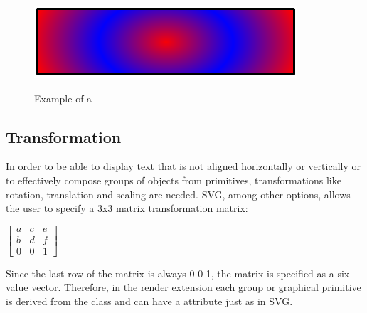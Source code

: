 \begin{figure}[h!]
  \centering
  \includegraphics[scale=0.5]{figures/radgrad01.pdf}\\
  \caption{Example of a \RadialGradient}
  \label{fig:lingrad}
\end{figure}






\subsection{Transformation}

In order to be able to display text that is not aligned horizontally or 
vertically or to effectively compose groups of objects from primitives, 
transformations like rotation, translation and scaling are needed. SVG, among 
other options, allows the user to specify a 3x3 matrix transformation matrix: 

\hspace*{0.4cm}
\begin{center}
\begin{math}\left[ \begin{array}{ccc} a & c & e \\ b & d & f \\ 0 & 0 & 1\end{array}\right]\end{math}
\end{center}
\hspace*{0.4cm}

Since the last row of the matrix is always 0 0 1, the matrix is specified as a 
six value vector. Therefore, in the render extension each group or graphical 
primitive is derived from the class \TransformationTwoD and can have a  attribute just as in SVG.

